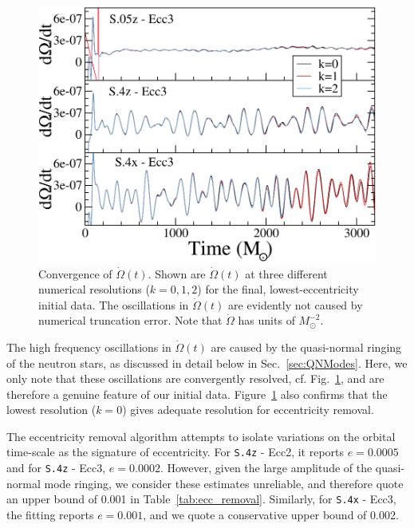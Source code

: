 \begin{figure}
  \includegraphics[width=0.92\columnwidth]{chap2/OmegaDotComparison}
  \caption[Convergence of the derivative of the binary orbital frequency.]{ {\label{fig:OmegaDotComparison}Convergence of
      $\dot\Omega(t)$. Shown are $\dot\Omega(t)$ at three different
      numerical resolutions ($k=0,1,2$) for the final,
      lowest-eccentricity initial data. The oscillations in
      $\dot\Omega(t)$ are evidently not caused by numerical truncation
      error. Note that $\dot{\Omega}$ has units of $M_{\odot}^{-2}$.}}
\end{figure}

The high frequency oscillations in $\dot\Omega(t)$ are caused by the
quasi-normal ringing of the neutron stars, as discussed in detail
below in Sec.~\ref{sec:QNModes}. Here, we only note that these
oscillations are convergently resolved,
cf. Fig.~\ref{fig:OmegaDotComparison}, and are therefore a genuine
feature of our initial data. Figure~\ref{fig:OmegaDotComparison} also
confirms that the lowest resolution ($k=0$) gives adequate resolution
for eccentricity removal.

The eccentricity removal algorithm attempts to isolate variations on
the orbital time-scale as the signature of eccentricity. For
{\tt S.4z} - Ecc2, it reports $e=0.0005$ and for {\tt S.4z} - Ecc3, $e=0.0002$.
However, given the large amplitude of the quasi-normal mode ringing, we consider
these estimates unreliable, and therefore quote an upper bound of
0.001 in Table~\ref{tab:ecc_removal}. Similarly, for {\tt S.4x} - Ecc3, the fitting
reports $e=0.001$, and we quote a conservative upper bound of 0.002.

